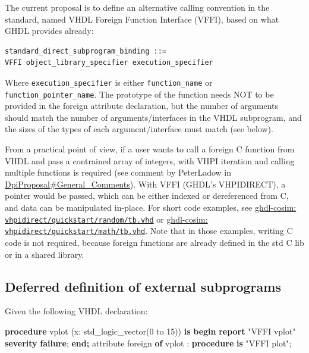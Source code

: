 \documentclass[
]{article}
\newenvironment{Shaded}{\begin{snugshade}}{\end{snugshade}}
\newcommand{\ControlFlowTok}[1]{\textcolor[rgb]{0.13,0.29,0.53}{\textbf{#1}}}
\newcommand{\DataTypeTok}[1]{\textcolor[rgb]{0.13,0.29,0.53}{#1}}
\newcommand{\DecValTok}[1]{\textcolor[rgb]{0.00,0.00,0.81}{#1}}
\newcommand{\KeywordTok}[1]{\textcolor[rgb]{0.13,0.29,0.53}{\textbf{#1}}}
\newcommand{\NormalTok}[1]{#1}
\newcommand{\OtherTok}[1]{\textcolor[rgb]{0.56,0.35,0.01}{#1}}
\newcommand{\StringTok}[1]{\textcolor[rgb]{0.31,0.60,0.02}{#1}}
\begin{document}
The current proposal is to define an alternative calling convention in the standard, named VHDL Foreign Function Interface (VFFI), based on what GHDL provides already:

\begin{verbatim}
standard_direct_subprogram_binding ::=
VFFI object_library_specifier execution_specifier
\end{verbatim}

Where \texttt{execution\_specifier} is either \texttt{function\_name} or \texttt{function\_pointer\_name}. The prototype of the function needs NOT to be provided in the foreign attribute declaration, but the number of arguments should match the number of arguments/interfaces in the VHDL subprogram, and the sizes of the types of each argument/interface must match (see below).

From a practical point of view, if a user wants to call a foreign C function from VHDL and pass a contrained array of integers, with VHPI iteration and calling multiple functions is required (see comment by PeterLadow in \href{http://www.eda-twiki.org/cgi-bin/view.cgi/P1076/DpiProposal\#General_Comments}{DpiProposal\#General\_Comments}). With VFFI (GHDL's VHPIDIRECT), a pointer would be passed, which can be either indexed or dereferenced from C, and data can be manipulated in-place. For short code examples, see \href{https://github.com/ghdl/ghdl-cosim/blob/master/vhpidirect/quickstart/random/tb.vhd}{ghdl-cosim: \texttt{vhpidirect/quickstart/random/tb.vhd}} or \href{https://github.com/ghdl/ghdl-cosim/blob/master/vhpidirect/quickstart/math/tb.vhd}{ghdl-cosim: \texttt{vhpidirect/quickstart/math/tb.vhd}}. Note that in those examples, writing C code is not required, because foreign functions are already defined in the std C lib or in a shared library.

\hypertarget{deferreddef}{%
\subsection{Deferred definition of external subprograms}\label{deferreddef}}

Given the following VHDL declaration:

\begin{Shaded}
\begin{Highlighting}[]
\KeywordTok{procedure} \DecValTok{vplot}\NormalTok{ (x}\OtherTok{:} \DataTypeTok{std\_logic\_vector}\NormalTok{(}\DecValTok{0} \OtherTok{to} \DecValTok{15}\NormalTok{)) }\ControlFlowTok{is}
\KeywordTok{begin} \KeywordTok{report} \StringTok{"VFFI vplot"} \KeywordTok{severity} \KeywordTok{failure}\NormalTok{; }\KeywordTok{end;}
\OtherTok{attribute}\NormalTok{ foreign }\KeywordTok{of}\NormalTok{ vplot }\OtherTok{:} \KeywordTok{procedure} \KeywordTok{is} \StringTok{"VFFI plot"}\NormalTok{;}
\end{Highlighting}
\end{Shaded}
\end{document}
